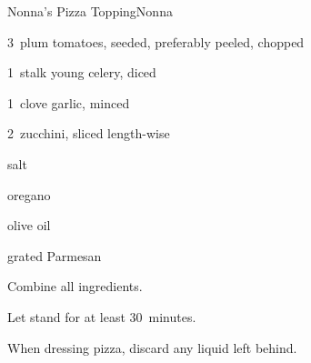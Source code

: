 \begin{recipe}{Nonna's Pizza Topping}{Nonna}{}

\begin{ingredients}
\item 3~plum tomatoes, seeded, preferably peeled, chopped
\item 1~stalk young celery, diced
\item 1~clove garlic, minced
\item 2~zucchini, sliced length-wise
\item salt
\item oregano
\item olive oil
\item grated Parmesan
\end{ingredients}

\begin{directions}
\item Combine all ingredients.
\item Let stand for at least 30~minutes.
\item When dressing pizza, discard any liquid left behind.
\end{directions}

\end{recipe}
